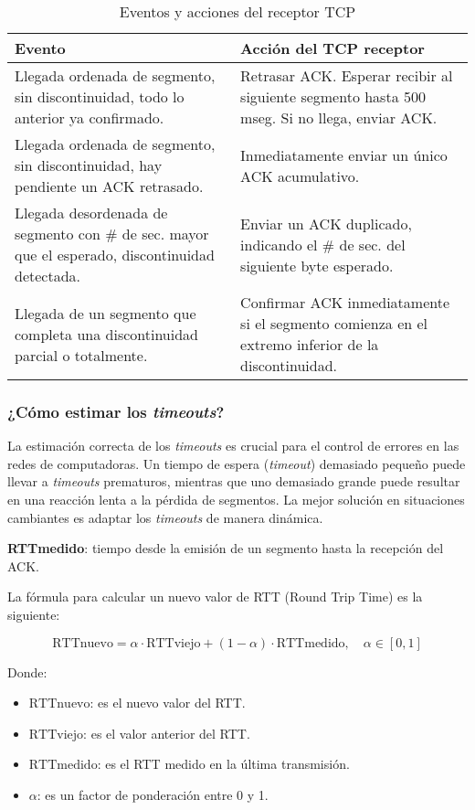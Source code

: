 \documentclass[a4paper,12pt]{article}
\begin{document}
\begin{table}[H]
    \centering
    \begin{tabular}{|p{8cm}|p{8cm}|}
    \hline
    \textbf{Evento} & \textbf{Acción del TCP receptor} \\ \hline
    Llegada ordenada de segmento, sin discontinuidad, todo lo anterior ya confirmado. & Retrasar ACK. Esperar recibir al siguiente segmento hasta 500 mseg. Si no llega, enviar ACK. \\ \hline
    Llegada ordenada de segmento, sin discontinuidad, hay pendiente un ACK retrasado. & Inmediatamente enviar un único ACK acumulativo. \\ \hline
    Llegada desordenada de segmento con \# de sec. mayor que el esperado, discontinuidad detectada. & Enviar un ACK duplicado, indicando el \# de sec. del siguiente byte esperado. \\ \hline
    Llegada de un segmento que completa una discontinuidad parcial o totalmente. & Confirmar ACK inmediatamente si el segmento comienza en el extremo inferior de la discontinuidad. \\ \hline
    \end{tabular}
    \caption{Eventos y acciones del receptor TCP}
\end{table}
    
\subsubsection{¿Cómo estimar los \textit{timeouts}?}

La estimación correcta de los \textit{timeouts} es crucial para el control de errores en las redes de computadoras. Un tiempo de espera (\textit{timeout}) demasiado pequeño puede llevar a \textit{timeouts} prematuros, mientras que uno demasiado grande puede resultar en una reacción lenta a la pérdida de segmentos. La mejor solución en situaciones cambiantes es adaptar los \textit{timeouts} de manera dinámica.

\textbf{RTTmedido}: tiempo desde la emisión de un segmento hasta la recepción del ACK.

La fórmula para calcular un nuevo valor de RTT (Round Trip Time) es la siguiente:

\[
\text{RTTnuevo} = \alpha \cdot \text{RTTviejo} + (1 - \alpha) \cdot \text{RTTmedido}, \quad \alpha \in [0,1]
\]

Donde:
\begin{itemize}
    \item \(\text{RTTnuevo}\): es el nuevo valor del RTT.
    \item \(\text{RTTviejo}\): es el valor anterior del RTT.
    \item \(\text{RTTmedido}\): es el RTT medido en la última transmisión.
    \item \(\alpha\): es un factor de ponderación entre 0 y 1.
\end{itemize}
\end{document}
